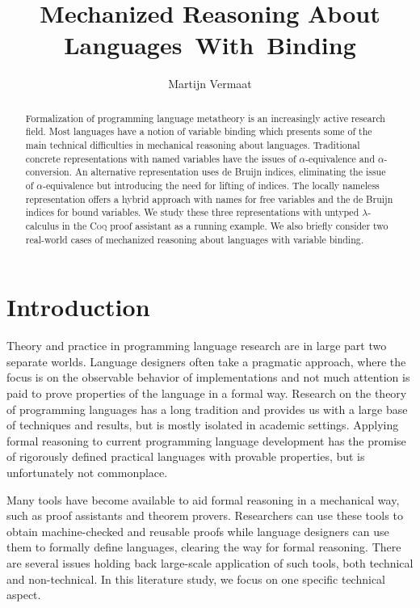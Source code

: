 \documentclass[a4paper,11pt]{article}
\title{Mechanized Reasoning About Languages~With~Binding}
\author{Martijn Vermaat}
\date{}
\newcommand{\name}[1]{\textsc{#1}\xspace}
\def\Coq{\name{Coq}}
\begin{document}
\maketitle


\begin{abstract}
Formalization of programming language metatheory is an increasingly
active research field. Most languages have a notion of variable
binding which presents some of the main technical difficulties in
mechanical reasoning about languages. Traditional concrete
representations with named variables have the issues of
$\alpha$-equivalence and $\alpha$-conversion. An alternative
representation uses de Bruijn indices, eliminating the issue of
$\alpha$-equivalence but introducing the need for lifting of indices.
The locally nameless representation offers a hybrid approach with names
for free variables and the de Bruijn indices for bound variables.
We study these three representations with untyped $\lambda$-calculus
in the \Coq proof assistant as a running example. We also briefly
consider two real-world cases of mechanized reasoning about languages
with variable binding.
\end{abstract}


\section{Introduction}\label{sec:introduction}

Theory and practice in programming language research are in large part
two separate worlds.
Language designers often take a pragmatic approach, where the focus is
on the observable behavior of implementations and not much attention
is paid to prove properties of the language in a formal way.
Research on the theory of programming languages has a long tradition and
provides us with a large base of techniques and results, but is mostly
isolated in academic settings.
Applying formal reasoning to current programming language development
has the promise of rigorously defined practical languages with provable
properties, but is unfortunately not commonplace.

Many tools have become available to aid formal reasoning in a mechanical
way, such as proof assistants and theorem provers.
Researchers can use these tools to obtain machine-checked and reusable
proofs while language designers can use them to formally define languages,
clearing the way for formal reasoning.
There are several issues holding back large-scale application of such
tools, both technical and non-technical. In this literature study, we
focus on one specific technical aspect.
\end{document}
